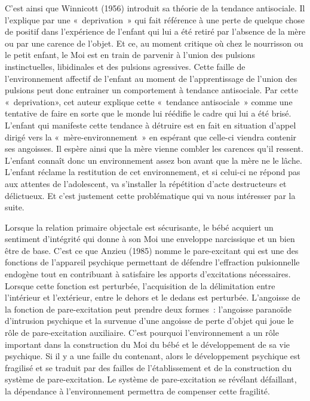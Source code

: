 \documentclass[12pt, a4paper]{book}
\begin{document}
\begin{spacing}{1.5}
C'est ainsi que Winnicott (1956) introduit sa théorie de la tendance antisociale. Il l'explique par une « deprivation » qui fait référence à une perte de quelque chose de positif dans l'expérience de l'enfant qui lui a été retiré  par l'absence de la mère ou par une carence de l'objet. Et ce, au moment critique où chez le nourrisson ou le petit enfant, le Moi est en train de parvenir à l'union des pulsions instinctuelles, libidinales et des pulsions agressives. Cette faille de l'environnement affectif de l'enfant au moment de l'apprentissage de l'union des pulsions peut donc entrainer un comportement à tendance antisociale. Par cette « deprivation», cet auteur explique cette « tendance antisociale » comme une tentative de faire en sorte que le monde lui réédifie le cadre qui lui a été brisé. L'enfant qui manifeste cette tendance à détruire est en fait en situation d'appel dirigé vers la « mère-environnement » en espérant que celle-ci viendra contenir ses angoisses. Il espère ainsi que la mère vienne combler les carences qu'il ressent. L'enfant connaît donc un environnement assez bon avant que la mère ne le lâche. L'enfant réclame la restitution de cet environnement, et si celui-ci ne répond pas aux attentes de l'adolescent, va s'installer la répétition d'acte destructeurs et délictueux. Et c'est justement cette problématique qui va nous intéresser par la suite.

Lorsque la relation primaire objectale est sécurisante, le bébé acquiert un sentiment d'intégrité qui donne à son Moi une enveloppe narcissique et un bien être de base. C'est ce que Anzieu (1985) nomme le pare-excitant qui est une des fonctions de l'appareil psychique permettant de défendre l'effraction pulsionnelle endogène tout en contribuant à satisfaire les apports d'excitations nécessaires. Lorsque cette fonction est perturbée, l'acquisition de la délimitation entre l'intérieur et l'extérieur, entre le dehors et le dedans est perturbée. L'angoisse de la fonction de pare-excitation peut prendre deux formes : l'angoisse paranoïde d'intrusion psychique et la survenue d'une angoisse de perte d'objet qui joue le rôle de pare-excitation auxiliaire. C'est pourquoi l'environnement a un rôle important dans la construction du Moi du bébé et le développement de sa vie psychique. Si il y a une faille du contenant, alors le développement psychique est fragilisé et se traduit par des failles de l'établissement et de la construction du système de pare-excitation. Le système de pare-excitation se révélant défaillant, la dépendance à l'environnement permettra de compenser cette fragilité.


\end{spacing}
\end{document}
